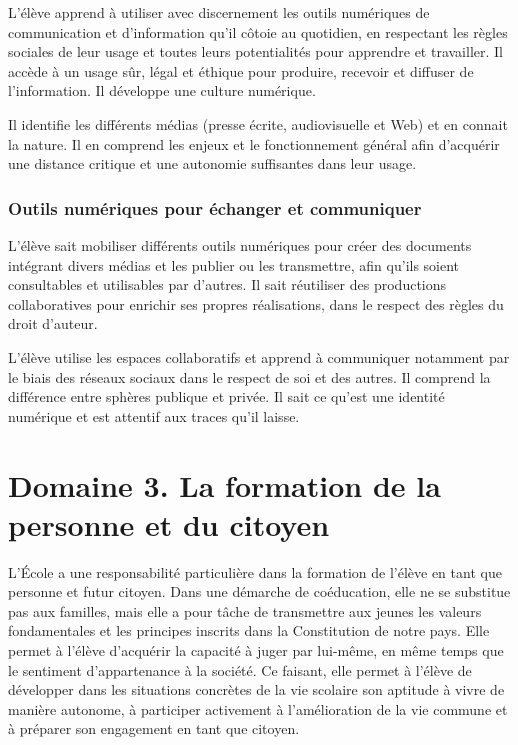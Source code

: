 L’élève apprend à utiliser avec discernement les outils numériques de communication et d’information qu’il côtoie au quotidien, en respectant les règles sociales de leur usage et toutes leurs potentialités pour apprendre et travailler. Il accède à un usage sûr, légal et éthique pour produire, recevoir et diffuser de l’information. Il développe une culture numérique.

Il identifie les différents médias (presse écrite, audiovisuelle et Web) et en connait la nature. Il en comprend les enjeux et le fonctionnement général afin d’acquérir une distance critique et une autonomie suffisantes dans leur usage.

\subsubsection{Outils numériques pour échanger et communiquer}
L’élève sait mobiliser différents outils numériques pour créer des documents intégrant divers médias et les publier ou les transmettre, afin qu’ils soient consultables et utilisables par d’autres. Il sait réutiliser des productions collaboratives pour enrichir ses propres réalisations, dans le respect des règles du droit d’auteur.

L’élève utilise les espaces collaboratifs et apprend à communiquer notamment par le biais des réseaux sociaux dans le respect de soi et des autres. Il comprend la différence entre sphères publique et privée. Il sait ce qu’est une identité numérique et est attentif aux traces qu’il laisse.

\section{Domaine 3. La formation de la personne et du citoyen}
L’École a une responsabilité particulière dans la formation de l’élève en tant que personne et futur citoyen. Dans une démarche de coéducation, elle ne se substitue pas aux familles, mais elle a pour tâche de transmettre aux jeunes les valeurs fondamentales et les principes inscrits dans la Constitution de notre pays. Elle permet à l’élève d’acquérir la capacité à juger par lui-même, en même temps que le sentiment d’appartenance à la société. Ce faisant, elle permet à l’élève de développer dans les situations concrètes de la vie scolaire son aptitude à vivre de manière autonome, à participer activement à l’amélioration de la vie commune et à préparer son engagement en tant que citoyen.

